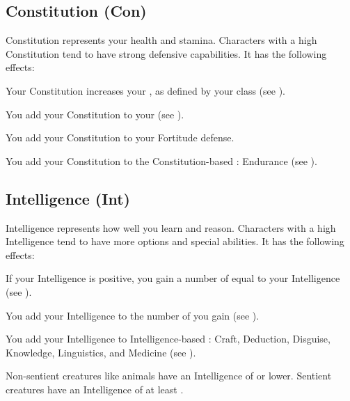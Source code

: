     \subsection{Constitution (Con)}\label{Constitution}
        {
            Constitution represents your health and stamina.
            Characters with a high Constitution tend to have strong defensive capabilities.
            It has the following effects:
            \begin{raggeditemize}
                \item Your Constitution increases your , as defined by your class (see ).
                \item You add your Constitution to your  (see ).
                \item You add your Constitution to your Fortitude defense.
                \item You add your Constitution to the Constitution-based : Endurance (see ).
            \end{raggeditemize}
        }

    \subsection{Intelligence (Int)}\label{Intelligence}
        {
            Intelligence represents how well you learn and reason.
            Characters with a high Intelligence tend to have more options and special abilities.
            It has the following effects:

            \begin{raggeditemize}
                \item If your Intelligence is positive, you gain a number of  equal to your Intelligence (see ).
                \item You add your Intelligence to the number of  you gain (see ).
                \item You add your Intelligence to Intelligence-based : Craft, Deduction, Disguise, Knowledge, Linguistics, and Medicine (see ).
            \end{raggeditemize}

            \par Non-sentient creatures like animals have an Intelligence of  or lower.
            Sentient creatures have an Intelligence of at least .
        }


